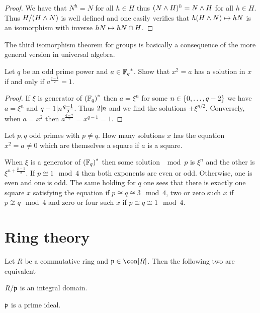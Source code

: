 \documentclass[8pt,a4paper]{article}
\begin{document}
\begin{proof}
We have that $N^h=N$ for all $h\in H$ thus $(N\wedge H)^h=N\wedge H$ for all $h\in H$. Thus $H/(H\wedge N)$ is well defined and one easily verifies that $h(H\wedge N)\mapsto hN$ is an isomorphism with inverse $hN\mapsto hN\cap H$.
\end{proof}

\begin{remark}
    The third isomorphism theorem for groups is basically a consequence of the more general version in universal algebra.
\end{remark}

\begin{lemma}[Gauss]
    Let $q$ be an odd prime power and $a\in{\mathbb{F}_{q}}^{\ast}$. Show that $x^2=a$ has a solution in $x$ if and only if $a^{\frac{q-1}{2}}=1$.
\end{lemma}

\begin{proof}
    If $\xi$ is generator of ${(\mathbb{F}_{q})}^{\ast}$ then $a=\xi^n$ for some $n\in\set{0,\ldots,q-2}$ we have $a=\xi^n$ and $q-1| n\frac{q-1}{2}$. Thus $2| n$ and we find the solutions $\pm\xi^{n/2}$. Conversely, when $a=x^2$ then $a^{\frac{q-2}{2}}=x^{q-1}=1$.
\end{proof}

\begin{exercise}
    Let $p,q$ odd primes with $p\neq q$. How many solutions $x$ has the equation $x^2=a\neq 0$ which are themselves a square if $a$ is a square.
\end{exercise}

\begin{solution}
    When $\xi$ is a generator of ${(\mathbb{F}_{q})}^{\ast}$ then some solution $\mod p$ is $\xi^n$ and the other is $\xi^{n+\frac{p-1}{2}}$. If $p\cong 1\mod 4$ then both exponents are even or odd. Otherwise, one is even and one is odd. The same holding for $q$ one sees that there is exactly one square $x$ satisfying the equation if $p\cong q\cong 3\mod 4$, two or zero such $x$ if $p\not\cong q \mod 4$ and  zero or four such $x$ if $p\cong q\cong 1\mod 4$.
\end{solution}


\section{Ring theory}

\begin{lemma}
    Let $R$ be a commutative ring and $\fkp\in\con[R]$. Then the following two are equivalent
    \begin{statements}
            \item\label{quot-int-dom} $R/\mathfrak{p}$ is an integral domain.
            \item\label{prim-id} $\mathfrak{p}$ is a prime ideal.
    \end{statements}
\end{lemma}
\end{document}
